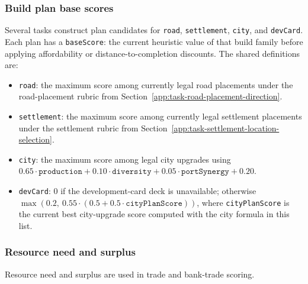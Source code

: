 \documentclass[letter,  12 pt]{article}
\begin{document}
\subsubsection{Build plan base scores}
\label{app:build-plan-base-scores}
Several tasks construct plan candidates for \texttt{road}, \texttt{settlement}, \texttt{city}, and \texttt{devCard}. Each plan has a \texttt{baseScore}: the current heuristic value of that build family before applying affordability or distance-to-completion discounts. The shared definitions are:
\begin{itemize}
    \item \texttt{road}: the maximum score among currently legal road placements under the road-placement rubric from Section~\ref{app:task-road-placement-direction}.
    \item \texttt{settlement}: the maximum score among currently legal settlement placements under the settlement rubric from Section~\ref{app:task-settlement-location-selection}.
    \item \texttt{city}: the maximum score among legal city upgrades using $0.65 \cdot \texttt{production} + 0.10 \cdot \texttt{diversity} + 0.05 \cdot \texttt{portSynergy} + 0.20$.
    \item \texttt{devCard}: $0$ if the development-card deck is unavailable; otherwise $\max(0.2,\ 0.55 \cdot (0.5 + 0.5 \cdot \texttt{cityPlanScore}))$, where \texttt{cityPlanScore} is the current best city-upgrade score computed with the city formula in this list.
\end{itemize}

\subsubsection{Resource need and surplus}
\label{app:resource-need-and-surplus}
Resource need and surplus are used in trade and bank-trade scoring. 
\end{document}
